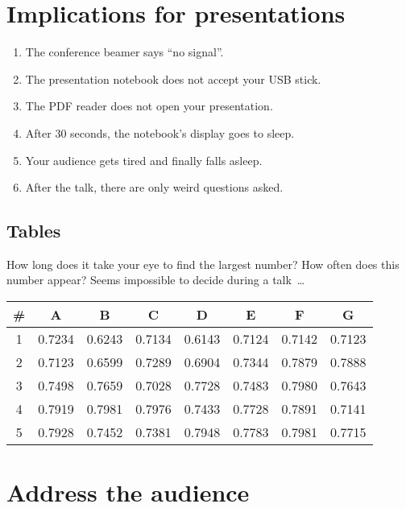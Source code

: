 \documentclass[
	paper=128mm:96mm,	%
	fontsize=11pt,		%
	pagesize,		%
	parskip=half-,		%
	numbers=noendperiod,	%
	captions=nooneline	%
	]{scrartcl}		%
\newcommand*{\mygreen}[1]{\textcolor{mygreen}{#1}}
\newcommand*{\mybrown}[1]{\textcolor{mybrown}{#1}}
\newcommand*{\myred}[1]{\textcolor{myred}{#1}}
\theoremstyle{mythmstyle}
\begin{document}
\section{Implications for presentations}
\begin{enumerate}
	\item The conference beamer says \myred{``no signal''}.
	\item The presentation notebook does \myred{not accept} your USB stick.
	\item The PDF reader does \myred{not open} your presentation. 
	\item After 30 seconds, the notebook's \mybrown{display goes to sleep}. 
	\item Your audience gets tired and finally falls \mybrown{asleep}.
	\item After the talk, there are only \mygreen{weird questions} asked.
\end{enumerate}	
\clearpage
%
%
\subsection{Tables}
How long does it take your eye to find the largest number? How often does this number appear? Seems \myred{impossible} to decide during a talk~\dots

\begin{tabularx}{\textwidth}{@{\extracolsep{\fill}}cccccccc}
   \toprule
   \multicolumn{1}{c}{\#}&\multicolumn{1}{c}{A}&\multicolumn{1}{c}{B}&\multicolumn{1}{c}{C}&\multicolumn{1}{c}{D}&\multicolumn{1}{c}{E}&\multicolumn{1}{c}{F}&\multicolumn{1}{c}{G}\\ 
   \midrule
   1&0.7234&0.6243&0.7134&0.6143&0.7124&0.7142&0.7123\\
   2&0.7123&0.6599&0.7289&0.6904&0.7344&0.7879&0.7888\\
   3&0.7498&0.7659&0.7028&0.7728&0.7483&0.7980&0.7643\\
   4&0.7919&0.7981&0.7976&0.7433&0.7728&0.7891&0.7141\\
   5&0.7928&0.7452&0.7381&0.7948&0.7783&0.7981&0.7715\\
   \bottomrule
\end{tabularx}
\clearpage
%
%
\section{Address the audience}
\begin{minipage}[c]{0.8\textwidth}
\end{minipage}
\clearpage
%
%
\end{document}
